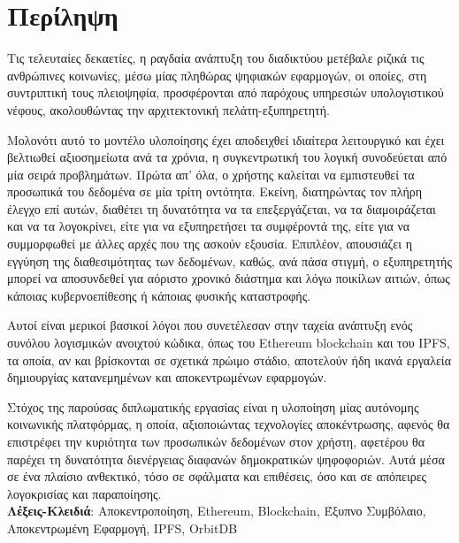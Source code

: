 \chapter*{Περίληψη}
Τις τελευταίες δεκαετίες, η ραγδαία ανάπτυξη του διαδικτύου μετέβαλε ριζικά τις ανθρώπινες
κοινωνίες, μέσω μίας πληθώρας ψηφιακών εφαρμογών, οι οποίες, στη συντριπτική τους πλειοψηφία, προσφέρονται από παρόχους υπηρεσιών υπολογιστικού νέφους, ακολουθώντας την αρχιτεκτονική πελάτη-εξυπηρετητή.

Μολονότι αυτό το μοντέλο υλοποίησης έχει αποδειχθεί ιδιαίτερα λειτουργικό και έχει βελτιωθεί αξιοσημείωτα ανά τα χρόνια, η συγκεντρωτική του λογική συνοδεύεται από μία σειρά προβλημάτων. Πρώτα απ' όλα, ο χρήστης καλείται να εμπιστευθεί τα προσωπικά του δεδομένα σε μία τρίτη οντότητα. Εκείνη, διατηρώντας τον πλήρη έλεγχο επί αυτών, διαθέτει τη δυνατότητα να τα επεξεργάζεται, να τα διαμοιράζεται και να τα λογοκρίνει, είτε για να εξυπηρετήσει τα συμφέροντά της, είτε για να συμμορφωθεί με άλλες αρχές που της ασκούν εξουσία. Επιπλέον, απουσιάζει η εγγύηση της διαθεσιμότητας των δεδομένων, καθώς, ανά πάσα στιγμή, ο εξυπηρετητής μπορεί να αποσυνδεθεί για αόριστο χρονικό διάστημα και λόγω ποικίλων αιτιών, όπως κάποιας κυβερνοεπίθεσης ή κάποιας φυσικής καταστροφής.

Αυτοί είναι μερικοί βασικοί λόγοι που συνετέλεσαν στην ταχεία ανάπτυξη ενός συνόλου λογισμικών ανοιχτού κώδικα, όπως του Ethereum blockchain και του IPFS, τα οποία, αν και βρίσκονται σε σχετικά πρώιμο στάδιο, αποτελούν ήδη ικανά εργαλεία δημιουργίας κατανεμημένων και αποκεντρωμένων εφαρμογών.

Στόχος της παρούσας διπλωματικής εργασίας είναι η υλοποίηση μίας αυτόνομης κοινωνικής πλατφόρμας,
η οποία, αξιοποιώντας τεχνολογίες αποκέντρωσης, αφενός θα επιστρέφει την κυριότητα των προσωπικών
δεδομένων στον χρήστη, αφετέρου θα παρέχει τη δυνατότητα διενέργειας διαφανών δημοκρατικών ψηφοφοριών. Αυτά μέσα σε ένα πλαίσιο ανθεκτικό, τόσο σε σφάλματα και επιθέσεις, όσο και σε απόπειρες λογοκρισίας και παραποίησης.
\\[2\baselineskip]
\textbf{Λέξεις-Κλειδιά}: Αποκεντροποίηση, Ethereum, Blockchain, Έξυπνο Συμβόλαιο, Αποκεντρωμένη Εφαρμογή, IPFS, OrbitDB